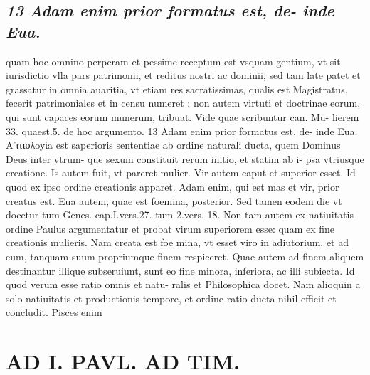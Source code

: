 \documentclass{article}
\begin{document}
\begin{pages}
\subsection*{\textit{13 Adam enim prior formatus est, de- inde Eua.}}quam hoc omnino perperam et pessime receptum est vsquam gentium, vt sit iurisdictio vlla pars patrimonii, et reditus nostri ac dominii, sed tam late patet et grassatur in omnia auaritia, vt etiam res sacratissimas, qualis est Magistratus, fecerit patrimoniales et in censu numeret : non autem virtuti et doctrinae eorum, qui sunt capaces eorum munerum, tribuat. Vide quae scribuntur can. Mu- lierem 33. quaest.5. de hoc argumento. 13 Adam enim prior formatus est, de- inde Eua. A’ιτιολoyίa est saperioris sententiae ab ordine naturali ducta, quem Dominus Deus inter vtrum- que sexum constituit rerum initio, et statim ab i- psa vtriusque creatione. Is autem fuit, vt pareret mulier. Vir autem caput et superior esset. Id quod ex ipso ordine creationis apparet. Adam enim, qui est mas et vir, prior creatus est. Eua autem, quae est foemina, posterior. Sed tamen eodem die vt docetur tum Genes. cap.I.vers.27. tum 2.vers. 18. Non tam autem ex natiuitatis ordine Paulus argumentatur et probat virum superiorem esse: quam ex fine creationis mulieris. Nam creata est foe mina, vt esset viro in adiutorium, et ad eum, tanquam suum propriumque finem respiceret. Quae autem ad finem aliquem destinantur illique subseruiunt, sunt eo fine minora, inferiora, ac illi subiecta. Id quod verum esse ratio omnis et natu- ralis et Philosophica docet. Nam alioquin a solo natiuitatis et productionis tempore, et ordine ratio ducta nihil efficit et concludit. Pisces enim  \pend
\section*{AD I. PAVL. AD TIM. }
\marginpar{[ p.88 ]}\pstart {}
{}

\end{pages}
\end{document}
